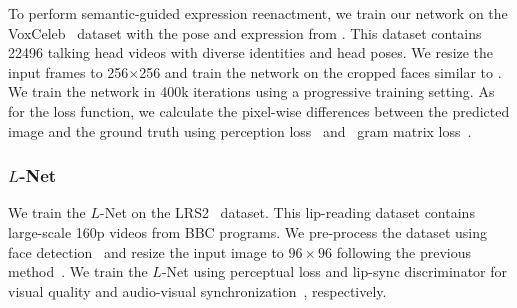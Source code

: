 To perform semantic-guided expression reenactment, we train our network on the VoxCeleb~\cite{voxceleb} dataset with the pose and expression from \cite{face3d}. This dataset contains 22496 talking head videos with diverse identities and head poses. We resize the input frames to 256$\times$256 and train the network on the cropped faces similar to \cite{fomm}. 
We train the network in 400k iterations using a progressive training setting.
As for the loss function, we calculate the pixel-wise differences between the predicted image and the ground truth using perception loss~\cite{zhang2018lpips} and ~gram matrix loss~\cite{gatys2016image}.


\subsubsection{$L$-Net}
We train the $L$-Net on the LRS2~\cite{lrs2} dataset. This lip-reading dataset contains large-scale 160p videos from BBC programs. We pre-process the dataset using face detection~\cite{fan} and resize the input image to $96\times96$ following the previous method~\cite{wav2lip}. 
We train the $L$-Net using perceptual loss and lip-sync discriminator for visual quality and audio-visual synchronization~\cite{wav2lip}, respectively. 


